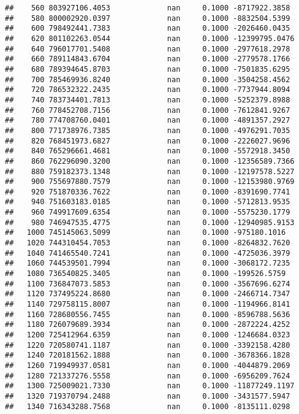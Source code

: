 \documentclass[
]{article}
\begin{document}
\begin{verbatim}
##    560 803927106.4053             nan     0.1000 -8717922.3858
##    580 800002920.0397             nan     0.1000 -8832504.5399
##    600 798492441.7383             nan     0.1000 -2026460.0435
##    620 801102263.0544             nan     0.1000 -12399795.0476
##    640 796017701.5408             nan     0.1000 -2977618.2978
##    660 789114843.6704             nan     0.1000 -2779578.1766
##    680 789394645.8703             nan     0.1000 -7501835.6295
##    700 785469936.8240             nan     0.1000 -3504258.4562
##    720 786532322.2435             nan     0.1000 -7737944.8094
##    740 783734401.7813             nan     0.1000 -5252379.8988
##    760 778452708.7156             nan     0.1000 -7612841.9267
##    780 774708760.0401             nan     0.1000 -4891357.2927
##    800 771738976.7385             nan     0.1000 -4976291.7035
##    820 768451973.6827             nan     0.1000 -2226027.9696
##    840 765296661.4681             nan     0.1000 -5572918.3450
##    860 762296090.3200             nan     0.1000 -12356589.7366
##    880 759182373.1348             nan     0.1000 -12197578.5227
##    900 755697880.7579             nan     0.1000 -12153980.9769
##    920 751870336.7622             nan     0.1000 -8391690.7741
##    940 751603183.0185             nan     0.1000 -5712813.9535
##    960 749917609.6354             nan     0.1000 -5575230.1779
##    980 746947535.4775             nan     0.1000 -12940985.9153
##   1000 745145063.5099             nan     0.1000 -975180.1016
##   1020 744310454.7053             nan     0.1000 -8264832.7620
##   1040 741465540.7241             nan     0.1000 -4725036.3979
##   1060 744539501.7994             nan     0.1000 -3068172.7235
##   1080 736540825.3405             nan     0.1000 -199526.5759
##   1100 736847073.5853             nan     0.1000 -3567696.6274
##   1120 737495224.8680             nan     0.1000 -2466714.7347
##   1140 729758115.8007             nan     0.1000 -1194966.8141
##   1160 728680556.7455             nan     0.1000 -8596788.5636
##   1180 726079689.3934             nan     0.1000 -2872224.4252
##   1200 725412964.6359             nan     0.1000 -1246684.0323
##   1220 720580741.1187             nan     0.1000 -3392158.4280
##   1240 720181562.1888             nan     0.1000 -3678366.1828
##   1260 719949937.0581             nan     0.1000 -4044879.2069
##   1280 721337276.5558             nan     0.1000 -6956209.7624
##   1300 725009021.7330             nan     0.1000 -11877249.1197
##   1320 719370794.2488             nan     0.1000 -3431577.5947
##   1340 716343288.7568             nan     0.1000 -8135111.0298

\end{verbatim}
\end{document}

